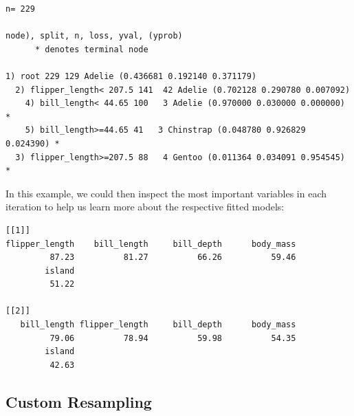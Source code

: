 \begin{Shaded}
\begin{Highlighting}[]
\OtherTok{=}  \NormalTok{)}
\SpecialCharTok{$}\NormalTok{learners[[}\NormalTok{]]}\SpecialCharTok{$}
\end{Highlighting}
\end{Shaded}

\begin{verbatim}
n= 229 

node), split, n, loss, yval, (yprob)
      * denotes terminal node

1) root 229 129 Adelie (0.436681 0.192140 0.371179)  
  2) flipper_length< 207.5 141  42 Adelie (0.702128 0.290780 0.007092)  
    4) bill_length< 44.65 100   3 Adelie (0.970000 0.030000 0.000000) *
    5) bill_length>=44.65 41   3 Chinstrap (0.048780 0.926829 0.024390) *
  3) flipper_length>=207.5 88   4 Gentoo (0.011364 0.034091 0.954545) *
\end{verbatim}

In this example, we could then inspect the most important variables in
each iteration to help us learn more about the respective fitted models:

\begin{Shaded}
\begin{Highlighting}[]
\SpecialCharTok{$}\NormalTok{learners[}\SpecialCharTok{:}\NormalTok{], }\SpecialCharTok{$}\SpecialCharTok{$}
\end{Highlighting}
\end{Shaded}

\begin{verbatim}
[[1]]
flipper_length    bill_length     bill_depth      body_mass 
         87.23          81.27          66.26          59.46 
        island 
         51.22 

[[2]]
   bill_length flipper_length     bill_depth      body_mass 
         79.06          78.94          59.98          54.35 
        island 
         42.63 
\end{verbatim}

\hypertarget{sec-resamp-custom}{%
\subsection{Custom Resampling}\label{sec-resamp-custom}}

